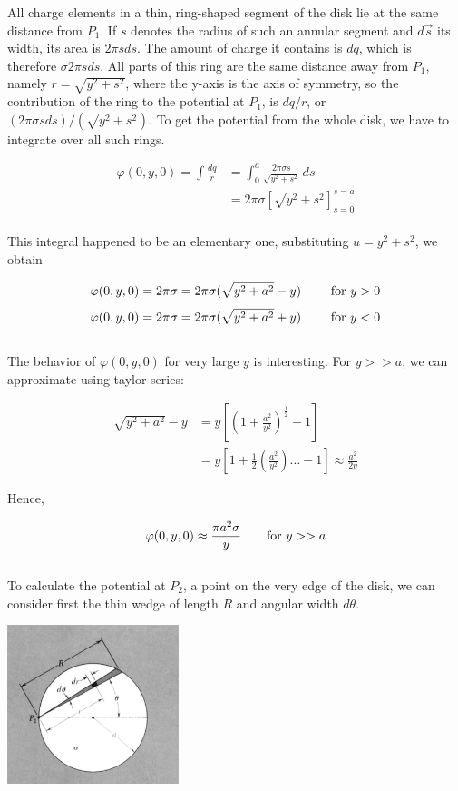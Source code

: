 \documentclass[svgnames]{article}
\begin{document}
All charge elements in a thin, ring-shaped segment of the disk lie at the same distance from $P_1$. If $s$ denotes the radius of such an annular segment and $d\vec{s}$ its width, its area is $2\pi s ds$. The amount of charge it contains is $dq$, which is therefore $\sigma 2\pi s ds$. All parts of this ring are the same distance away from $P_1$, namely $r = \sqrt{y^2 + s^2}$, where the y-axis is the axis of symmetry, so the contribution of the ring to the potential at $P_1$, is $dq / r$, or $(2\pi \sigma s ds)/(\sqrt{y^2 + s^2})$. To get the potential from the whole disk, we have to integrate over all such rings. 

\begin{align*} 
\varphi(0, y, 0) = \int \frac{dq}{r} &= \int_0^a \frac{2\pi \sigma s}{\sqrt{y^2 + s^2}}\,ds \\
&= 2\pi \sigma \left[\sqrt{y^2 + s^2 }\right]_{s=0}^{s=a} 
\end{align*} \\

This integral happened to be an elementary one, substituting $u = y^2 + s^2$, we obtain 

\[ \varphi(0, y, 0) = 2\pi\sigma = 2\pi \sigma (\sqrt{y^2 + a^2} - y) \hspace{20px} \text{ for $y > 0$} \]
\[ \varphi(0, y, 0) = 2\pi\sigma = 2\pi \sigma (\sqrt{y^2 + a^2} + y) \hspace{20px} \text{ for $y < 0$} \]\\

The behavior of $\varphi (0, y, 0)$ for very large $y$ is interesting. For $ y >> a$, we can approximate using taylor series: 

\begin{align*} \sqrt{y^2 + a^2} - y &= y \left[\left(1+\frac{a^2}{y^2}\right)^\frac{1}{2} - 1 \right] \\
&= y \left[1 + \frac{1}{2} \left(\frac{a^2}{y^2}\right) \dots - 1 \right] \approx \frac{a^2}{2y} 
\end{align*}

Hence, 

\[ \varphi(0, y, 0) \approx \frac{\pi a^2 \sigma}{y} \hspace{20px} \text{for $y >> a$} \] \\ 

To calculate the potential at $P_2$, a point on the very edge of the disk, we can consider first the thin wedge of length $R$ and angular width $d\theta$. 

\begin{center}
\includegraphics[width = 50mm]{ss11.png}
\end{center} 
\end{document}
